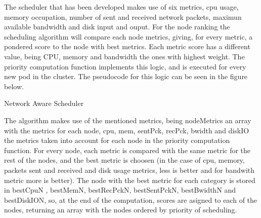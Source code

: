 \documentclass[conference]{IEEEtran}
\makeatletter
\def\BState{\State\hskip-\ALG@thistlm}
\makeatother
\begin{document}
The scheduler that has been developed makes use of six metrics, cpu usage, memory occupation, number of sent and received network packets,
maximun available bandwidth and disk input and ouput. For the node ranking the scheduling algorithm will compare each node metrics, giving, for every metric, a pondered score to the node
with best metrics. Each metric score has a different value, being CPU, memory and bandwidth the ones with highest weight.
The priority computation function implements this logic, and is executed for every new pod in the cluster.
The pseudocode for this logic can be seen in the figure below.


\begin{algorithm}

\caption{Network Aware Scheduler}\label{Kubernetes}

\end{algorithm}


The algorithm makes use of the mentioned metrics, being nodeMetrics an array with the metrics for each node, cpu, mem, sentPck, recPck, bwidth and diskIO
the metrics taken into account for each node in the priority computation function. For every node, each metric is compared with the same metric for the rest of the nodes, and the
best metric is choosen (in the case of cpu, memory, packets sent and received and disk usage metrics, less is better and for bandwith metric more is better). The node with the best
metric for each category is stored in bestCpuN , bestMemN, bestRecPckN, bestSentPckN, bestBwidthN and bestDiskION, so, at the end of the computation, scores are asigned to each of
the nodes, returning an array with the nodes ordered by priority of scheduling.
\end{document}
